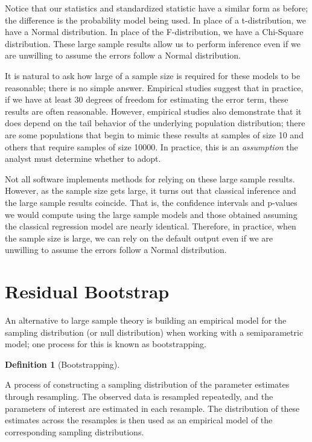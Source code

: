 \documentclass[
  letterpaper,
  DIV=11,
  numbers=noendperiod]{scrreprt}
\theoremstyle{definition}
\newtheorem{definition}{Definition}[chapter]
\theoremstyle{definition}
\theoremstyle{remark}
\begin{document}
Notice that our statistics and standardized statistic have a similar
form as before; the difference is the probability model being used. In
place of a t-distribution, we have a Normal distribution. In place of
the F-distribution, we have a Chi-Square distribution. These large
sample results allow us to perform inference even if we are unwilling to
assume the errors follow a Normal distribution.

It is natural to ask how large of a sample size is required for these
models to be reasonable; there is no simple answer. Empirical studies
suggest that in practice, if we have at least 30 degrees of freedom for
estimating the error term, these results are often reasonable. However,
empirical studies also demonstrate that it does depend on the tail
behavior of the underlying population distribution; there are some
populations that begin to mimic these results at samples of size 10 and
others that require samples of size 10000. In practice, this is an
\emph{assumption} the analyst must determine whether to adopt.

Not all software implements methods for relying on these large sample
results. However, as the sample size gets large, it turns out that
classical inference and the large sample results coincide. That is, the
confidence intervals and p-values we would compute using the large
sample models and those obtained assuming the classical regression model
are nearly identical. Therefore, in practice, when the sample size is
large, we can rely on the default output even if we are unwilling to
assume the errors follow a Normal distribution.

\hypertarget{residual-bootstrap}{%
\section{Residual Bootstrap}\label{residual-bootstrap}}

An alternative to large sample theory is building an empirical model for
the sampling distribution (or null distribution) when working with a
semiparametric model; one process for this is known as bootstrapping.

\begin{definition}[Bootstrapping]\protect\hypertarget{def-bootstrapping}{}\label{def-bootstrapping}

A process of constructing a sampling distribution of the parameter
estimates through resampling. The observed data is resampled repeatedly,
and the parameters of interest are estimated in each resample. The
distribution of these estimates across the resamples is then used as an
empirical model of the corresponding sampling distributions.

\end{definition}
\end{document}
